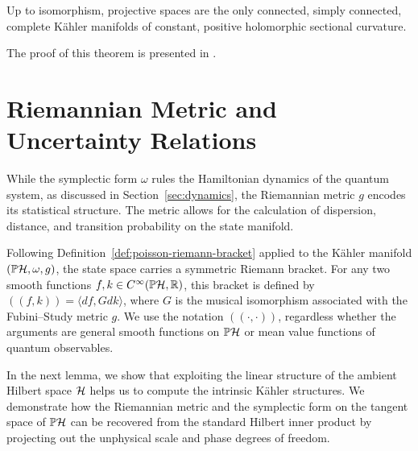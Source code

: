 \begin{theorem}
	\label{thm:hawley-igusa}
	Up to isomorphism, projective spaces are the only connected, simply connected, complete Kähler manifolds of constant, positive holomorphic sectional curvature.
\end{theorem}

\noindent The proof of this theorem is presented in \cite[Theorem 7.9]{kobayashiFoundationsDifferentialGeometry1996}.


\section{Riemannian Metric and Uncertainty Relations}
\label{sec:riemannian-geometry}

While the symplectic form $\omega$ rules the Hamiltonian dynamics of the quantum system, as discussed in Section~\ref{sec:dynamics}, the Riemannian metric $g$ encodes its statistical structure. The metric allows for the calculation of dispersion, distance, and transition probability on the state manifold.

\noindent Following Definition~\ref{def:poisson-riemann-bracket} applied to the Kähler manifold $(\PH,\omega,g)$, the state space carries a symmetric Riemann bracket. For any two smooth functions $f,k \in C^\infty(\PH,\R)$, this bracket is defined by $((f,k)) = \langle df, G dk\rangle$, where $G$ is the musical isomorphism associated with the Fubini--Study metric $g$. We use the notation $((\cdot,\cdot))$, regardless whether the arguments are general smooth functions on $\PH$ or mean value functions of quantum observables.

\noindent In the next lemma, we show that exploiting the linear structure of the ambient Hilbert space $\H$ helps us to compute the intrinsic Kähler structures. We demonstrate how the Riemannian metric and the symplectic form on the tangent space of $\PH$ can be recovered from the standard Hilbert inner product by projecting out the unphysical scale and phase degrees of freedom.

